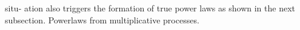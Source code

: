 situ- ation also triggers the formation of true power laws as shown in the next subsection. Powerlaws from multiplicative processes.




